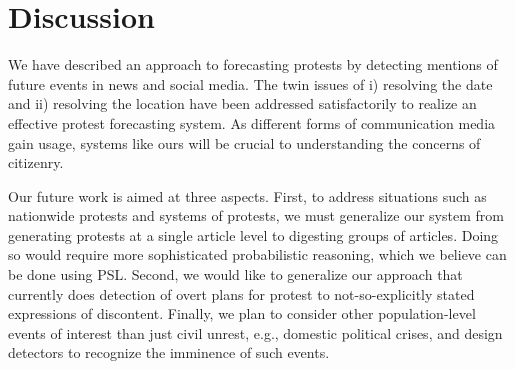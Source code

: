 \documentclass[letterpaper]{article}
\begin{document}
\section{Discussion}
We have described an approach to forecasting protests by detecting
mentions of future events in news and social media. The twin issues
of i) resolving the date and ii) resolving the location have been
addressed satisfactorily to realize an effective protest forecasting
system. As different forms of communication media gain usage, systems
like ours will be crucial to understanding the concerns of citizenry.

Our future work is aimed at three aspects. First, to address situations
such as nationwide protests and systems of protests, we must generalize
our system from generating protests at a single article level to
digesting groups of articles. Doing so would require more sophisticated
probabilistic reasoning, which we believe can be done using PSL.
Second, we would like to generalize our
approach that currently does detection of overt plans for protest to
not-so-explicitly stated expressions of discontent.  Finally, we plan to
consider other population-level events of interest than just civil
unrest, e.g., domestic political crises, and design detectors to
recognize the imminence of such events.
\end{document}
